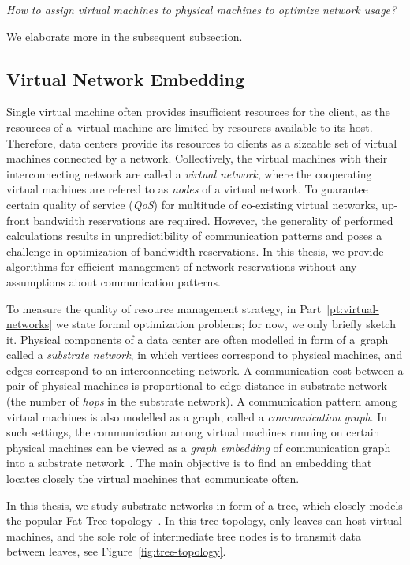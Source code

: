 \begin{center}
  \emph{How to assign virtual machines to physical machines to optimize network
  usage?}
\end{center}
We elaborate more in the subsequent subsection.

\subsection{Virtual Network Embedding}

Single virtual machine often provides insufficient resources for the client, as the resources of a~virtual machine are limited by resources available to its host.
Therefore, data centers provide its resources to clients as a sizeable set of virtual machines connected by a network.
Collectively, the virtual machines with their interconnecting network are called a \emph{virtual network}, where the cooperating virtual machines are refered to as \emph{nodes} of a virtual network.
To guarantee certain quality of service (\emph{QoS}) for multitude of co-existing virtual networks, up-front bandwidth reservations are required.
However, the generality of performed calculations results in unpredictibility of communication patterns and poses a challenge in optimization of bandwidth reservations.
In this thesis, we provide algorithms for efficient management of network reservations without any assumptions about communication patterns.

To measure the quality of resource management strategy, in Part~\ref{pt:virtual-networks} we state formal optimization problems; for now, we only briefly sketch it.
Physical components of a data center are often modelled in form of a~graph called a \emph{substrate network}, in which vertices correspond to physical machines, and edges correspond to an interconnecting network.
A communication cost between a pair of physical machines is proportional to edge-distance in substrate network (the number of \emph{hops} in the substrate network).
A communication pattern among virtual machines is also modelled as a graph, called a \emph{communication graph}.
In such settings, the communication among virtual machines running on certain physical machines can be viewed as a \emph{graph embedding} of communication graph into a substrate network~\cite{Goyal2008,gupta2001provisioning}.
The main objective is to find an embedding that locates closely the virtual machines that communicate often.

In this thesis, we study substrate networks in form of a tree, which closely models the popular Fat-Tree topology~\cite{fat-trees}.
In this tree topology, only leaves can host virtual machines, and the sole role of intermediate tree nodes is to transmit data between leaves, see Figure~\ref{fig:tree-topology}.


